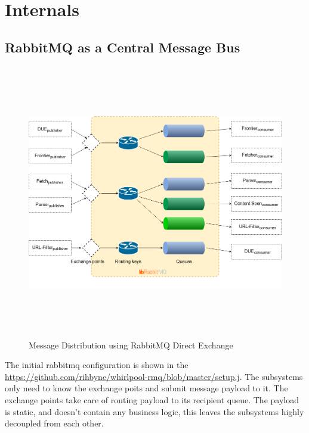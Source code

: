 \section{Internals}\label{internals}
\subsection{RabbitMQ as a Central Message Bus}
\begin{figure}[h!]
  \centering
  \includegraphics[width=20cm,height=12cm,keepaspectratio]{../media/crawler/rmq-broker.png}
  \caption{Message Distribution using RabbitMQ Direct Exchange}
  \label{fig:rmq}
\end{figure}

\noindent
The initial rabbitmq configuration is shown in the \url{https://github.com/rihbyne/whirlpool-rmq/blob/master/setup.j}. The subsystems only need to know the exchange poits and submit message payload to it. The exchange points take care of routing payload to its recipient queue. The payload is static, and doesn't contain any business logic, this leaves the subsystems highly decoupled from each other.
\pagebreak

